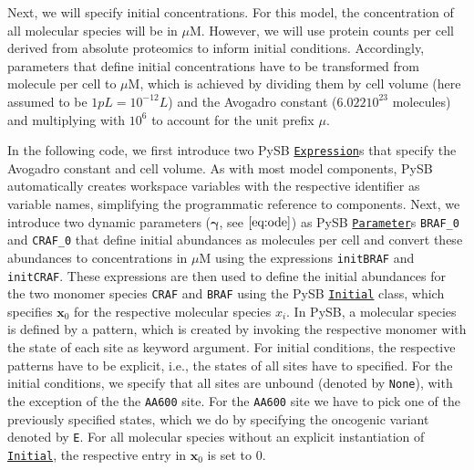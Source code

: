 \documentclass[11pt]{article}
\begin{document}
    Next, we will specify initial concentrations. For this model, the
concentration of all molecular species will be in \(\mu\mathrm{M}\).
However, we will use protein counts per cell derived from absolute
proteomics to inform initial conditions. Accordingly, parameters that
define initial concentrations have to be transformed from molecule per
cell to \(\mu\mathrm{M}\), which is achieved by dividing them by cell
volume (here assumed to be \(1pL = 10^{-12} L\)) and the Avogadro
constant (\(6.022 10^{23}\) molecules) and multiplying with \(10^{6}\)
to account for the unit prefix \(\mu\).

In the following code, we first introduce two PySB
\href{https://pysb.readthedocs.io/en/stable/modules/core.html\#pysb.core.Expression}{\texttt{Expression}}s
that specify the Avogadro constant and cell volume. As with most model
components, PySB automatically creates workspace variables with the
respective identifier as variable names, simplifying the programmatic
reference to components. Next, we introduce two dynamic parameters
(\(\boldsymbol{\gamma}\), see \(\eqref{eq:ode}\)) as PySB
\href{https://pysb.readthedocs.io/en/stable/modules/core.html\#pysb.core.Parameter}{\texttt{Parameter}}s
\texttt{BRAF\_0} and \texttt{CRAF\_0} that define initial abundances as
molecules per cell and convert these abundances to concentrations in
\(\mu\mathrm{M}\) using the expressions \texttt{initBRAF} and
\texttt{initCRAF}. These expressions are then used to define the initial
abundances for the two monomer species \texttt{CRAF} and \texttt{BRAF}
using the PySB
\href{https://pysb.readthedocs.io/en/stable/modules/core.html\#pysb.core.Initial}{\texttt{Initial}}
class, which specifies \(\textbf{x}_0\) for the respective molecular
species \(x_i\). In PySB, a molecular species is defined by a pattern,
which is created by invoking the respective monomer with the state of
each site as keyword argument. For initial conditions, the respective
patterns have to be explicit, i.e., the states of all sites have to
specified. For the initial conditions, we specify that all sites are
unbound (denoted by \texttt{None}), with the exception of the the
\texttt{AA600} site. For the \texttt{AA600} site we have to pick one of
the previously specified states, which we do by specifying the oncogenic
variant denoted by \texttt{E}. For all molecular species without an
explicit instantiation of
\href{https://pysb.readthedocs.io/en/stable/modules/core.html\#pysb.core.Initial}{\texttt{Initial}},
the respective entry in \(\textbf{x}_0\) is set to \(0\).
\end{document}
